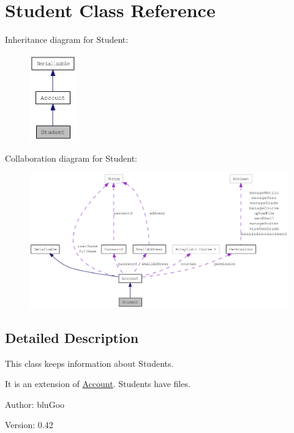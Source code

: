 \hypertarget{classStudent}{
\section{Student Class Reference}
\label{classStudent}
}
Inheritance diagram for Student:\nopagebreak
\begin{figure}[H]
\begin{center}
\leavevmode
\includegraphics[width=58pt]{classStudent__inherit__graph}
\end{center}
\end{figure}
Collaboration diagram for Student:\nopagebreak
\begin{figure}[H]
\begin{center}
\leavevmode
\includegraphics[width=400pt]{classStudent__coll__graph}
\end{center}
\end{figure}


\subsection{Detailed Description}
This class keeps information about Students. 

It is an extension of \hyperlink{classAccount}{Account}. Students have files.

\begin{Desc}
\item[Author:]bluGoo \end{Desc}
\begin{Desc}
\item[Version:]0.42 \end{Desc}


